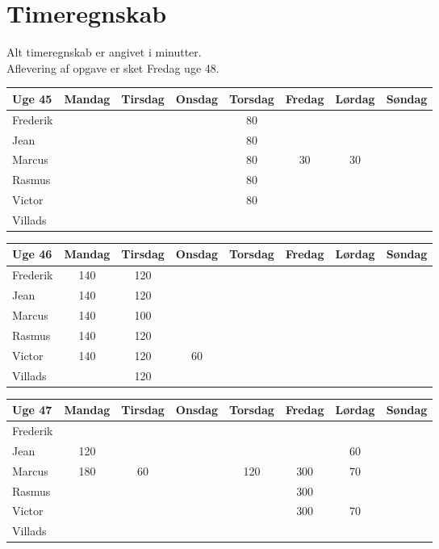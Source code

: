 \section*{Timeregnskab}

Alt timeregnskab er angivet i minutter.\\
Aflevering af opgave er sket Fredag uge 48.
\begin{table}[H]
\centering
\begin{tabular}{@{}lccccccc@{}} %
\toprule
Uge 45   & Mandag & Tirsdag & Onsdag & Torsdag & Fredag & Lørdag & Søndag \\ \midrule
Frederik &    &    &    &  80  &    &    &    \\
Jean     &    &    &    &  80  &    &    &    \\
Marcus   &    &    &    &  80  &  30  &  30  &    \\
Rasmus   &    &    &    &  80  &    &    &    \\
Victor   &    &    &    &  80  &    &    &    \\
Villads  &    &    &    &      &    &    &    \\ 
\end{tabular}

\begin{tabular}{@{}lccccccc@{}}
\toprule
Uge 46   & Mandag & Tirsdag & Onsdag & Torsdag & Fredag & Lørdag & Søndag \\ \midrule
Frederik &  140  &  120  &    &    &    &    &    \\
Jean     &  140  &  120  &    &    &    &    &    \\
Marcus   &  140  &  100  &    &    &    &    &    \\
Rasmus   &  140  &  120  &    &    &    &    &    \\
Victor   &  140  &  120  &  60  &    &    &    &    \\
Villads  &    &   120 &    &    &    &    &    \\ 
\end{tabular}

\begin{tabular}{@{}lccccccc@{}}
\toprule
Uge 47   & Mandag & Tirsdag & Onsdag & Torsdag & Fredag & Lørdag & Søndag \\ \midrule
Frederik &    &    &    &    &    &    &    \\
Jean     &  120  &    &    &    &    &  60  &    \\
Marcus   &  180  &  60  &    &  120  &  300  &  70  &    \\
Rasmus   &    &    &    &    &  300  &    &    \\
Victor   &    &    &    &    &  300  &  70  &    \\
Villads  &    &    &    &    &    &    &    \\ 
\end{tabular}


\end{table}
